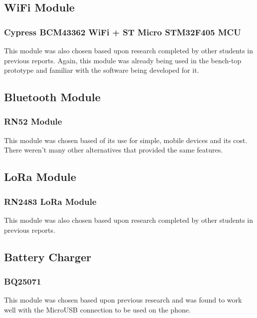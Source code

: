 \subsection{WiFi Module}
\subsubsection{Cypress BCM43362 WiFi + ST Micro STM32F405 MCU}
		This module was also chosen based upon research completed by other students in previous reports. 
Again, this module was already being used in the bench-top prototype and familiar with the software being developed for it. 


\subsection{Bluetooth Module}
\subsubsection{RN52 Module}
	This module was chosen based of its use for simple, mobile devices and its cost. 
There weren't many other alternatives that provided the same features. 


\subsection{LoRa Module}
\subsubsection{RN2483 LoRa Module}
	This module was also chosen based upon research completed by other students in previous reports.


\subsection{Battery Charger}
\subsubsection{BQ25071}
	This module was chosen based upon previous research and was found to work well with the MicroUSB connection to be used on the phone. 
		
